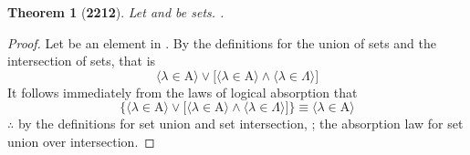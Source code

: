 \documentclass[preview]{standalone}
\newtheorem*{theorem*}{Theorem}
\begin{document}
\begin{theorem*}[\textbf{2212}] \color{black}
    Let  and \bm{$\Lambda$} be sets. 
    .
\end{theorem*}
\begin{proof} \color{black}
    Let \bm{$\lambda$} be an element in 
    . 
    By the definitions for the union of sets and the intersection of sets, that is
    \begin{equation*}
        \Big \langle \lambda \in \mathrm{A} \Big \rangle 
            \lor 
        \bigg[
            \Big \langle \lambda \in \mathrm{A} \Big \rangle 
                \land 
            \Big \langle \lambda \in \Lambda \Big \rangle
        \bigg]
    \end{equation*}
    It follows immediately from the laws of logical absorption that
    \begin{equation*}
        \Bigg\{
            \Big \langle \lambda \in \mathrm{A} \Big \rangle 
                \lor 
            \bigg[
                \Big \langle \lambda \in \mathrm{A} \Big \rangle 
                    \land 
                \Big \langle \lambda \in \Lambda \Big \rangle
            \bigg]
        \Bigg\}
            \equiv 
        \bigg \langle \lambda \in \mathrm{A} \bigg \rangle 
    \end{equation*}
    $\therefore$ by the definitions for set union and set intersection, 
    ; 
    the absorption law for set union over intersection.
\color{lightgray} \end{proof}
\end{document}

